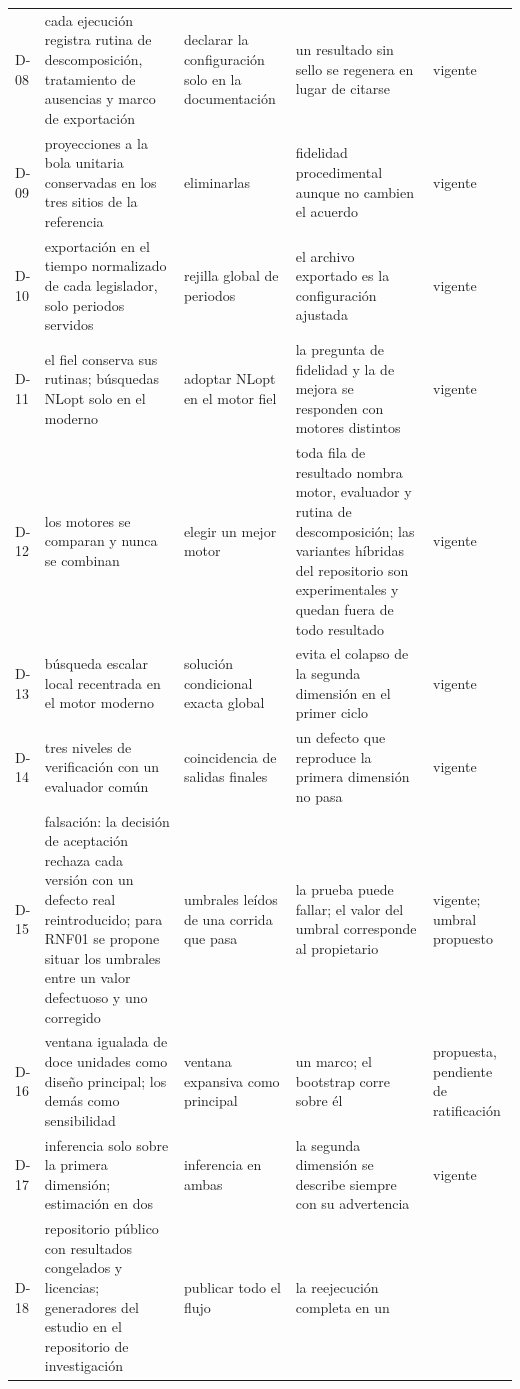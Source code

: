 \begin{longtable}{L{0.8cm}L{3.5cm}L{2.7cm}L{3.2cm}L{1.85cm}}
D-08 & cada ejecución registra rutina de descomposición, tratamiento de ausencias y marco de
exportación & declarar la configuración solo en la documentación & un resultado sin sello se
regenera en lugar de citarse & vigente \\
D-09 & proyecciones a la bola unitaria conservadas en los tres sitios de la referencia &
eliminarlas & fidelidad procedimental aunque no cambien el acuerdo & vigente \\
D-10 & exportación en el tiempo normalizado de cada legislador, solo periodos servidos &
rejilla global de periodos & el archivo exportado es la configuración ajustada & vigente \\
D-11 & el fiel conserva sus rutinas; búsquedas NLopt solo en el moderno & adoptar NLopt
en el motor fiel & la pregunta de fidelidad y la de mejora se responden con motores
distintos & vigente \\
D-12 & los motores se comparan y nunca se combinan & elegir un mejor motor & toda fila de
resultado nombra motor, evaluador y rutina de descomposición; las variantes híbridas del
repositorio son experimentales y quedan fuera de todo resultado & vigente \\
D-13 & búsqueda escalar local recentrada en el motor moderno & solución condicional exacta
global & evita el colapso de la segunda dimensión en el primer ciclo & vigente \\
D-14 & tres niveles de verificación con un evaluador común & coincidencia de salidas
finales & un defecto que reproduce la primera dimensión no pasa & vigente \\
D-15 & falsación: la decisión de aceptación rechaza cada versión con un defecto real
reintroducido; para RNF01 se propone situar los umbrales entre un valor defectuoso y uno
corregido & umbrales leídos de una corrida que pasa & la prueba puede fallar; el valor del
umbral corresponde al propietario & vigente; umbral propuesto \\
D-16 & ventana igualada de doce unidades como diseño principal; los demás como sensibilidad
& ventana expansiva como principal & un marco; el bootstrap corre sobre él & propuesta,
pendiente de ratificación \\
D-17 & inferencia solo sobre la primera dimensión; estimación en dos & inferencia en ambas &
la segunda dimensión se describe siempre con su advertencia & vigente \\
D-18 & repositorio público con resultados congelados y licencias; generadores del estudio en
el repositorio de investigación & publicar todo el flujo & la reejecución completa en un

\end{longtable}
